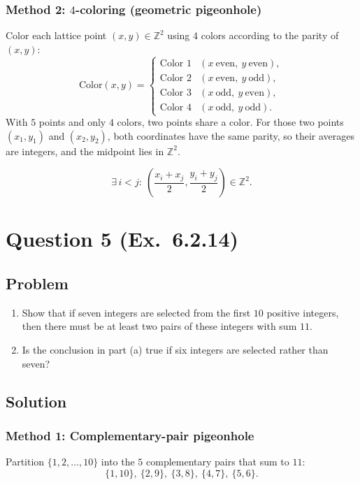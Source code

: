 \documentclass[12pt]{article}
\newcommand{\Z}{\mathbb{Z}}
\begin{document}
\subsubsection{Method 2: $4$-coloring (geometric pigeonhole)}
Color each lattice point $(x,y)\in\Z^2$ using $4$ colors according to the parity of $(x,y)$:
\[
\text{Color}(x,y)=
\begin{cases}
\text{Color 1} & (x\ \text{even},\ y\ \text{even}),\\
\text{Color 2} & (x\ \text{even},\ y\ \text{odd}),\\
\text{Color 3} & (x\ \text{odd},\ y\ \text{even}),\\
\text{Color 4} & (x\ \text{odd},\ y\ \text{odd}).
\end{cases}
\]
With $5$ points and only $4$ colors, two points share a color. For those two points $(x_1,y_1)$ and $(x_2,y_2)$, both coordinates have the same parity, so their averages are integers, and the midpoint lies in $\Z^2$.

\[
\boxed{\exists\, i<j:\ \left(\frac{x_i+x_j}{2},\frac{y_i+y_j}{2}\right)\in\Z^2.}
\]

\newpage

\section{Question 5 (Ex.\ 6.2.14)}
\subsection{Problem}
\begin{enumerate}[label=(\alph*)]
\item Show that if seven integers are selected from the first $10$ positive integers, then there must be at least two pairs of these integers with sum $11$.
\item Is the conclusion in part (a) true if six integers are selected rather than seven?
\end{enumerate}

\subsection{Solution}

\subsubsection{Method 1: Complementary-pair pigeonhole}
Partition $\{1,2,\dots,10\}$ into the $5$ complementary pairs that sum to $11$:
\[
\{1,10\},\ \{2,9\},\ \{3,8\},\ \{4,7\},\ \{5,6\}.
\]
\end{document}
